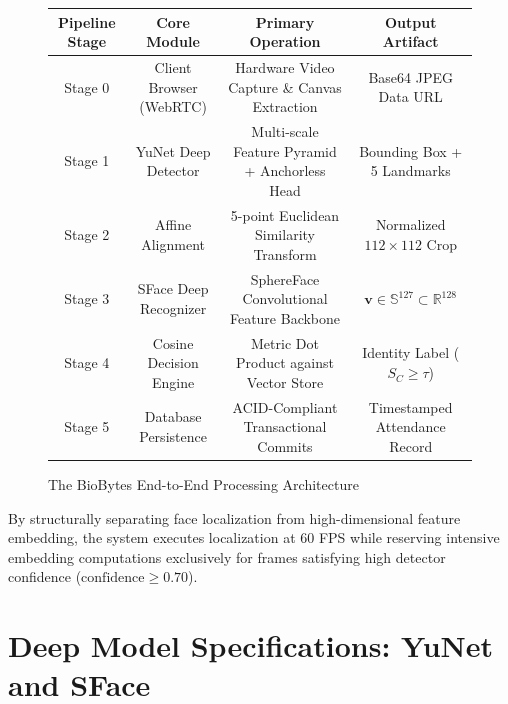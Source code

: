 \documentclass[12pt,a4paper,oneside]{report}
\begin{document}
\begin{figure}[htbp]
\centering
\small
\renewcommand{\arraystretch}{1.3}
\begin{tabular}{|c|c|c|c|}
\hline
\textbf{Pipeline Stage} & \textbf{Core Module} & \textbf{Primary Operation} & \textbf{Output Artifact} \\
\hline
Stage 0 & Client Browser (WebRTC) & Hardware Video Capture \& Canvas Extraction & Base64 JPEG Data URL \\
Stage 1 & YuNet Deep Detector & Multi-scale Feature Pyramid + Anchorless Head & Bounding Box + 5 Landmarks \\
Stage 2 & Affine Alignment & 5-point Euclidean Similarity Transform & Normalized $112 \times 112$ Crop \\
Stage 3 & SFace Deep Recognizer & SphereFace Convolutional Feature Backbone & $\mathbf{v} \in \mathbb{S}^{127} \subset \mathbb{R}^{128}$ \\
Stage 4 & Cosine Decision Engine & Metric Dot Product against Vector Store & Identity Label ($S_C \geq \tau$) \\
Stage 5 & Database Persistence & ACID-Compliant Transactional Commits & Timestamped Attendance Record \\
\hline
\end{tabular}
\caption{The BioBytes End-to-End Processing Architecture}
\label{fig:pipeline_table}
\end{figure}

By structurally separating face localization from high-dimensional feature embedding, the system executes localization at 60 FPS while reserving intensive embedding computations exclusively for frames satisfying high detector confidence ($\text{confidence} \geq 0.70$).

\section{Deep Model Specifications: YuNet and SFace}
\end{document}
